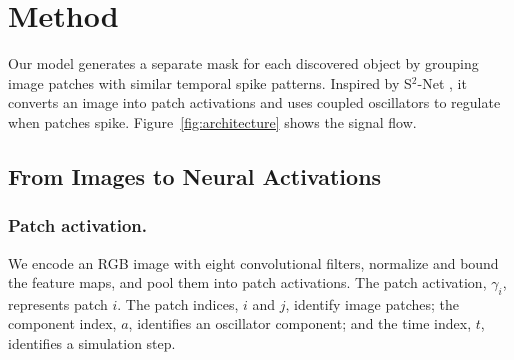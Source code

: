 %
%

\section{Method}
\label{sec:method}

Our model generates a separate mask for each discovered object by grouping image patches with
similar temporal spike patterns. Inspired by S$^2$-Net \citep{dan2026oscillatory}, it converts an
image into patch activations and uses coupled oscillators to regulate when patches spike.
Figure~\ref{fig:architecture} shows the signal flow.



\subsection{From Images to Neural Activations}

\subsubsection{Patch activation.}
We encode an RGB image with eight convolutional filters, normalize and bound the feature maps, and
pool them into patch activations. The patch activation, $\gamma_i$, represents patch $i$. The patch
indices, $i$ and $j$, identify image patches; the component index, $a$, identifies an oscillator
component; and the time index, $t$, identifies a simulation step.

